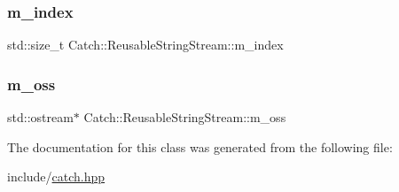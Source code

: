 \subsubsection{\texorpdfstring{m\_index}{m\_index}}
{\footnotesize\ttfamily std\+::size\+\_\+t Catch\+::\+Reusable\+String\+Stream\+::m\+\_\+index\hspace{0.3cm}{\ttfamily [private]}}

\mbox{\label{class_catch_1_1_reusable_string_stream_ae8dc0aa8ab418990869cd5ea9ee51f14}} 
\subsubsection{\texorpdfstring{m\_oss}{m\_oss}}
{\footnotesize\ttfamily std\+::ostream$\ast$ Catch\+::\+Reusable\+String\+Stream\+::m\+\_\+oss\hspace{0.3cm}{\ttfamily [private]}}



The documentation for this class was generated from the following file\+:\begin{DoxyCompactItemize}
\item 
include/\mbox{\hyperlink{catch_8hpp}{catch.\+hpp}}\end{DoxyCompactItemize}
